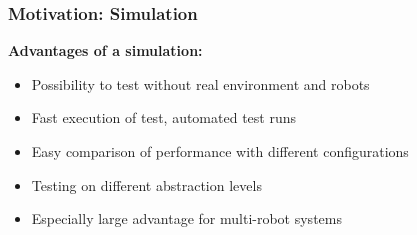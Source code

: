 \documentclass[]{beamer}
\begin{document}

\begin{frame}
  \frametitle{Motivation: Simulation}
  \textbf{\large Advantages of a simulation:}
  \hspace{2cm}\\
  \begin{itemize}
  \item Possibility to test without real environment and robots
    \pause
  \item Fast execution of test, automated test runs
    \pause
  \item Easy comparison of performance with different configurations 
    \pause
  \item Testing on different abstraction levels
    \pause
  \item Especially large advantage for multi-robot systems
  \end{itemize}
\end{frame}
\end{document}
